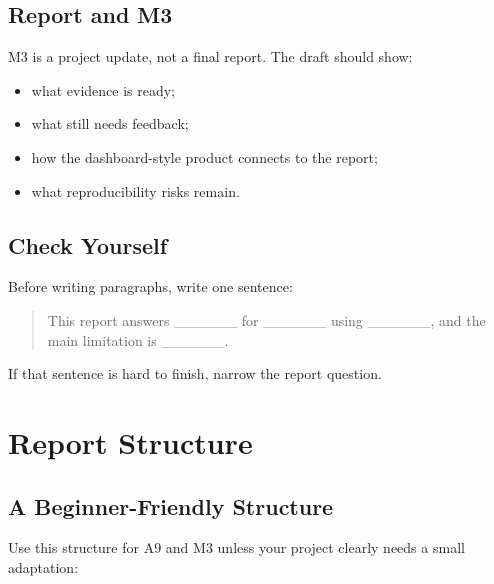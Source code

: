 \documentclass[
  letterpaper,
  DIV=11,
  numbers=noendperiod,
  oneside]{scrreprt}
\providecommand{\tightlist}{%
  \setlength{\itemsep}{0pt}\setlength{\parskip}{0pt}}
\begin{document}
\section*{Report and M3}\label{report-and-m3}


M3 is a project update, not a final report. The draft should show:

\begin{itemize}
\tightlist
\item
  what evidence is ready;
\item
  what still needs feedback;
\item
  how the dashboard-style product connects to the report;
\item
  what reproducibility risks remain.
\end{itemize}

\section*{Check Yourself}\label{check-yourself-1}


Before writing paragraphs, write one sentence:

\begin{quote}
This report answers \_\_\_\_\_\_ for \_\_\_\_\_\_ using \_\_\_\_\_\_,
and the main limitation is \_\_\_\_\_\_.
\end{quote}

If that sentence is hard to finish, narrow the report question.

\chapter*{Report Structure}\label{report-structure}


\section*{A Beginner-Friendly
Structure}\label{a-beginner-friendly-structure}


Use this structure for A9 and M3 unless your project clearly needs a
small adaptation:
\end{document}
